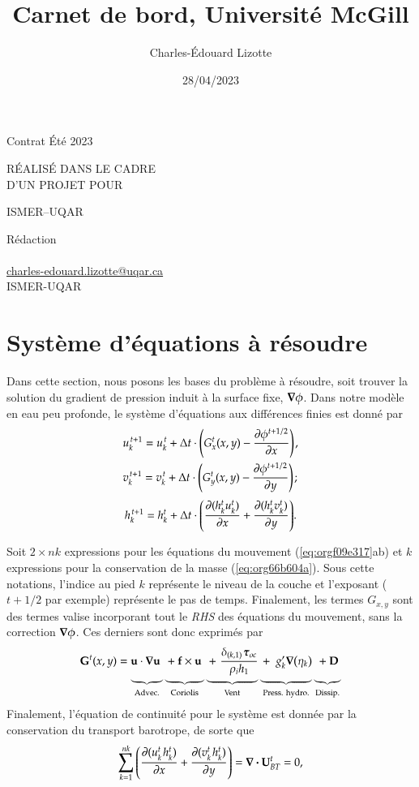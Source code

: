 \documentclass[10pt]{article}
\author{Charles-Édouard Lizotte}
\date{28/04/2023}
\title{Carnet de bord, Université McGill}
\makeatletter
\numberwithin{equation}{section}
\newcommand{\bigno}{\vphantom{\qty(\frac{d}{q})}}
\newcommand{\pt}{\hspace{1pt}}
\newcommand{\mytitlepage}{
\begin{titlepage}
\begin{center}
{\Large Contrat Été 2023 \par}
\vspace{2cm}
{\Large \MakeUppercase{\thetitle} \par}
\vspace{2cm}
RÉALISÉ DANS LE CADRE\\ D'UN PROJET POUR \par
\vspace{2cm}
{\Large ISMER--UQAR \par}
\vspace{2cm}
{\thedate}
\end{center}
\vfill
Rédaction \\
{\theauthor}\\
\url{charles-edouard.lizotte@uqar.ca}\\
ISMER-UQAR
\end{titlepage}
}
\makeatother
\begin{document}
\mytitlepage
\tableofcontents\newpage

\section{Système d'équations à résoudre}
\label{sec:orgcb8f9bc}

Dans cette section, nous posons les bases du problème à résoudre, soit trouver la solution du gradient de pression induit à la surface fixe, \(\gradient \phi\).
Dans notre modèle en eau peu profonde, le système d'équations aux différences finies est donné par
\begin{subequations}
\label{eq:orgf09e317}
\begin{align}
&u^{\pt t+1}_k = u^{\pt t}_k + \Delta t \cdot \qty(G^t_x(x,y) - \pdv{\phi^{t+1/2}}{x})\pt,\\
&v^{\pt t+1}_k = v^{\pt t}_k + \Delta t \cdot \qty(G^t_y(x,y) - \pdv{\phi^{t+1/2}}{y})\pt;
\end{align}
\end{subequations}
\begin{equation}
\label{eq:org66b604a}
h^{\pt t+1}_k = h^t_k + \Delta t \cdot \qty(\pdv{(h^t_k u^t_k)}{x} + \pdv{(h^t_k v^t_k)}{y}).
\end{equation}

Soit \(2 \times nk\) expressions pour les équations du mouvement (\ref{eq:orgf09e317}ab) et \(k\) expressions pour la conservation de la masse (\ref{eq:org66b604a}). 
Sous cette notations, l'indice au pied \(k\) représente le niveau de la couche et l'exposant (\(t+1/2\) par exemple) représente le pas de temps.
Finalement, les termes \(G_{x,y}\) sont des termes valise incorporant tout le \emph{RHS} des équations du mouvement, sans la correction \(\gradient \phi\).
Ces derniers sont donc exprimés par
\begin{equation}
\vb{G}^t(x,y) =
\underbrace{ \bigno\vb{u} \cdot \gradient{\vb{u}}\ }_\text{Advec.}
\underbrace{ \bigno + \vb{f}\times \vb{u}\ }_\text{Coriolis} 
\underbrace{ \bigno+\pt \frac{\delta_{(k,1)}\pt \boldsymbol{\tau}_{oc}}{\rho_i h_1}}_\text{Vent}
\underbrace{ \bigno+\ g'_{k} \gradient(\eta_k)}_\text{Press. hydro.}
\underbrace{ \bigno+ \vb{D}}_\text{Dissip.}
\end{equation}
Finalement, l'équation de continuité pour le système est donnée par la conservation du transport barotrope, de sorte que
\begin{equation}
\label{eq:org2553c1e}
\sum_{k=1}^{nk}  \qty(\pdv{(u^t_k\pt h^t_k)}{x} + \pdv{(v^t_k\pt h^t_k)}{y}) = \div{\vb{U}^t_{BT}} = 0,
\end{equation}
\end{document}
